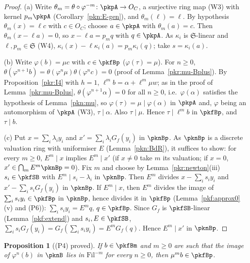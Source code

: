 \documentclass[10pt]{amsart}
\newtheorem{proposition}[theorem]{Proposition}
\theoremstyle{definition}
\theoremstyle{remark}
\begin{document}
\begin{proof}
(a) Write $\theta_m=\theta\circ\varphi^{-m}\colon\pkpA\to O_C$, a surjective ring map (W3) with kernel
$p_m\pkpA$ (Corollary~\ref{pkn:E-gen}), and $\theta_m(\ell)=\ell$. By hypothesis $\theta_m(x)=\ell c$ with
$c\in O_C$; choose $a\in\pkpA$ with $\theta_m(a)=c$. Then $\theta_m(x-\ell a)=0$, so $x-\ell a=p_mq$ with
$q\in\pkpA$. As $\kappa_i$ is $\mathfrak S$-linear and $\ell,p_m\in\mathfrak S$ (W4),
$\kappa_i(x)-\ell\kappa_i(a)=p_m\kappa_i(q)$; take $s=\kappa_i(a)$.

(b) Write $\varphi(b)=\mu c$ with $c\in\pkfBp$ ($\varphi(\tau)=\mu$). For $n\ge0$,
$\theta(\varphi^{n+1}b)=\theta(\varphi^n\mu)\theta(\varphi^nc)=0$ (proof of Lemma~\ref{pkr:mu-Bplus}). By
Proposition~\ref{pkr:I4} with $h=1$, $\ell^mb=\alpha+\ell^m\mu w$; as in the proof of
Lemma~\ref{pkr:mu-Bplus}, $\theta(\varphi^{n+1}\alpha)=0$ for all $n\ge0$, i.e.\ $\varphi(\alpha)$
satisfies the hypothesis of Lemma~\ref{pkn:mu}, so $\varphi(\tau)=\mu\mid\varphi(\alpha)$ in $\pkpA$ and,
$\varphi$ being an automorphism of $\pkpA$ (W3), $\tau\mid\alpha$. Also $\tau\mid\mu$. Hence
$\tau\mid\ell^mb$ in $\pkfBp$, and $\tau\mid b$.

(c) Put $x=\sum_i\lambda_iy_i$ and $x'=\sum_i\lambda_iG_f(y_i)$ in $\pknBp$. As $\pknBp$ is a discrete
valuation ring with uniformiser $E$ (Lemma~\ref{pkn:BdR}), it suffices to show: for every $m\ge0$,
$E^m\mid x$ implies $E^m\mid x'$ (if $x\ne0$ take $m$ its valuation; if $x=0$, $x'\in\bigcap_mE^m\pknBp=0$).
Fix $m$ and choose by Lemma~\ref{pkr:newton}(iii) $s_i\in\pkfSB$ with $E^m\mid s_i-\lambda_i$ in
$\pknBp$. Then $E^m$ divides $x-\sum_is_iy_i$ and $x'-\sum_is_iG_f(y_i)$ in $\pknBp$. If $E^m\mid x$, then
$E^m$ divides the image of $\sum_is_iy_i\in\pkfBp$ in $\pknBp$, hence divides it in $\pkfBp$
(Lemma~\ref{pkf:approx0}(v) and (P6)): $\sum_is_iy_i=E^mq$, $q\in\pkfBp$. Since $G_f$ is
$\pkfSB$-linear (Lemma~\ref{pkf:extend}) and $s_i,E\in\pkfSB$,
$\sum_is_iG_f(y_i)=G_f(\sum_is_iy_i)=E^mG_f(q)$. Hence $E^m\mid x'$ in $\pknBp$.
\end{proof}

\begin{proposition}[(P4) proved]\label{pkr:P4}
If $b\in\pkfBm$ and $m\ge0$ are such that the image of $\varphi^n(b)$ in $\pknB$ lies in
$\mathrm{Fil}^{-m}$ for every $n\ge0$, then $\mu^mb\in\pkfBp$.
\end{proposition}
\end{document}

